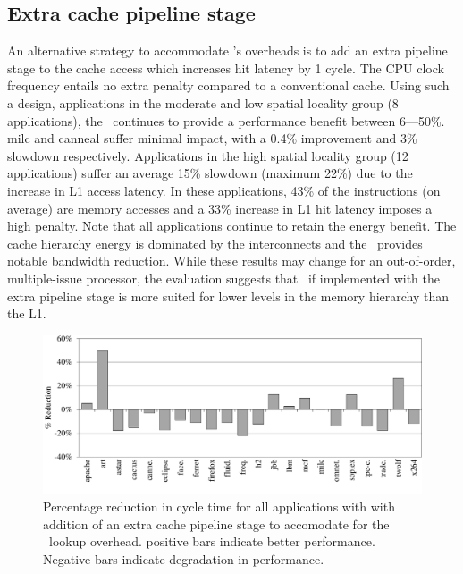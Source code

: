 {{\subsection{Extra cache pipeline stage}
\label{sec:extra_cache_pipeline_stage}

An alternative strategy to accommodate \AC{}'s overheads is to add an extra pipeline stage to the cache access which increases hit latency by 1 cycle. The CPU clock frequency entails no extra penalty compared to a conventional cache. Using such a design, applications in the moderate and low spatial locality group (8 applications), the \AC\ continues to provide a performance benefit between 6---50\%. milc and canneal suffer minimal impact, with a 0.4\% improvement and 3\% slowdown respectively.  Applications in the high spatial locality group (12 applications) suffer an average 15\% slowdown (maximum 22\%) due to the increase in L1 access latency. In these applications, 43\% of the instructions (on average) are memory accesses and a 33\% increase in L1 hit latency imposes a high penalty. Note that all applications continue to retain the energy benefit. The cache hierarchy energy is dominated by the interconnects and the \AC\ provides notable bandwidth reduction. While these results may change for an out-of-order, multiple-issue processor, the evaluation suggests that \AC\ if implemented with the extra pipeline stage is more suited for lower levels in the memory hierarchy than the L1.  

\begin{figure}[h]
  \centering
  \vspace{10pt}
  \includegraphics[width=\textwidth]{files/Plots/08-ExtraStage.pdf}
  \caption[Extra Cache Pipeline Stage Performance]{Percentage reduction in cycle time for all applications with with addition of an extra cache pipeline stage to accomodate for the \AC\ lookup overhead. positive bars indicate better performance. Negative bars indicate degradation in performance.}
  \label{fig:extra_cache_pipeline_stage}
\end{figure}

}}
